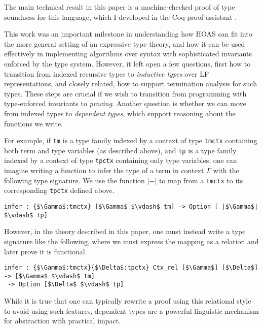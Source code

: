 \documentclass{article}
\begin{document}
The main technical result in this paper is a machine-checked proof of type
soundness for this language, which I developed in the Coq proof
assistant \citep{bertot/casteran:2004}.

This work was an important milestone in understanding how HOAS can fit
into the more general setting of an expressive type theory, and how it
can be used effectively in implementing algorithms over syntax with
sophisticated invariants enforced by the type system. However, it left open a few
questions, first how to transition from indexed recursive types to
\emph{inductive types} over LF representations, and closely related, how to support termination analysis for
such types. These steps are crucial if we wish to transition from
programming with type-enforced invariants to \emph{proving}. Another question is whether we can move
from indexed types to \emph{dependent types}, which support reasoning
about the functions we write.

For example, if \lstinline{tm} is a type family indexed by a context of type
\lstinline{tmctx} containing both term and type variables (as
described above), and \lstinline{tp} is a type family indexed by a
context of type \lstinline{tpctx} containing only type variables, one
can imagine writing a function to infer the type of a term in context
$\Gamma$ with the following type signature. We use the function $|-|$
to map from a \lstinline{tmctx} to its corresponding \lstinline{tpctx}
defined above.

\begin{lstlisting}
infer : {$\Gamma$:tmctx} [$\Gamma$ $\vdash$ tm] -> Option [ |$\Gamma$| $\vdash$ tp]
\end{lstlisting}

However, in the theory described in this paper, one must
instead write a type signature like the following, where we must
express the mapping as a relation and later prove it is functional.

\begin{lstlisting}
infer : {$\Gamma$:tmctx}{$\Delta$:tpctx} Ctx_rel [$\Gamma$] [$\Delta$] -> [$\Gamma$ $\vdash$ tm]
 -> Option [$\Delta$ $\vdash$ tp]
\end{lstlisting}

While it is true that one can typically rewrite a proof using this
relational style to avoid using such features, dependent types are a
powerful linguistic mechanism for abstraction with practical impact. 
\end{document}
